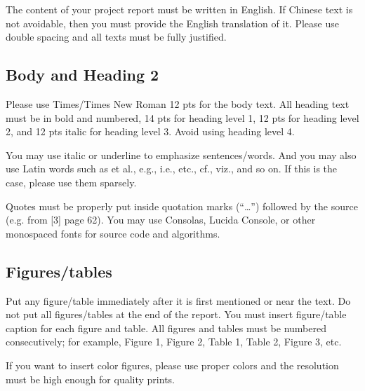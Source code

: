 The content of your project report must be written in English. If Chinese text is not avoidable, then you must provide the English translation of it. Please use double spacing and all texts must be fully justified.

\subsection{Body and Heading 2}
Please use Times/Times New Roman 12 pts for the body text. All heading text must be in bold and numbered, 14 pts for heading level 1, 12 pts for heading level 2, and 12 pts italic for heading level 3. Avoid using heading level 4.


You may use italic or underline to emphasize sentences/words. And you may also use Latin words such as et al., e.g., i.e., etc., cf., viz., and so on. If this is the case, please use them sparsely.


Quotes must be properly put inside quotation marks (“…”) followed by the source (e.g. from [3] page 62). You may use Consolas, Lucida Console, or other monospaced fonts for source code and algorithms.


\subsection{Figures/tables}

Put any figure/table immediately after it is first mentioned or near the text. Do not put all figures/tables at the end of the report. You must insert figure/table caption for each figure and table. All figures and tables must be numbered consecutively; for example, Figure 1, Figure 2, Table 1, Table 2, Figure 3, etc. 


If you want to insert color figures, please use proper colors and the resolution must be high enough for quality prints. 